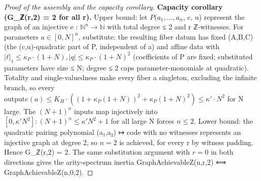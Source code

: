\documentclass[11pt]{article}
\theoremstyle{plain}
\theoremstyle{definition}
\theoremstyle{remark}
\theoremstyle{plain}
\theoremstyle{definition}
\theoremstyle{remark}
\theoremstyle{plain}
\theoremstyle{definition}
\theoremstyle{remark}
\begin{document}
\begin{proof}[Proof of the assembly and the capacity corollary]
\textbf{Capacity corollary (G\_ℤ(r,2) = 2 for all r).} Upper bound: let $P(a_{1},…,a_{n}$, c, u) represent the graph of an injective e : $ℕ^{n} → ℕ$ with total degree ≤ 2 and r ℤ-witnesses. For parameters $a ∈ [0,N]^{n}$, substitute: the resulting fiber datum has fixed (A,B,C) (the (c,u)-quadratic part of P, independent of a) and affine data with $|ℓ|_{1} ≤ κ_{P}·(1+N), |q| ≤ κ_{P}·(1+N)^{2}$ (coefficients of P are fixed; substituted parameters have size ≤ N; degree ≤ 2 caps parameter-monomials at quadratic). Totality and single-valuedness make every fiber a singleton, excluding the infinite branch, so every $\mathrm{output} e(a) ≤ K_{H}·((1+κ_{P}(1+N))^{2} + κ_{P}(1+N)^{2}) ≤ κ'·N^{2}$ for N large. The $(N+1)^{n}$ inputs map injectively into $[0, κ'N^{2}]: (N+1)^{n} ≤ κ'N^{2} + 1$ for all large N forces $n ≤ 2$. Lower bound: the quadratic pairing polynomial (a₁,a₂) ↦ code with no witnesses represents an injective graph at degree 2, so $n = 2$ is achieved, for every r by witness padding. Hence G\_ℤ(r,2) = 2. The same substitution argument with $r = 0$ in both directions gives the arity-spectrum inertia GraphAchievableZ(n,r,2) ⟺ GraphAchievableZ(n,0,2).

\end{proof}
\end{document}
